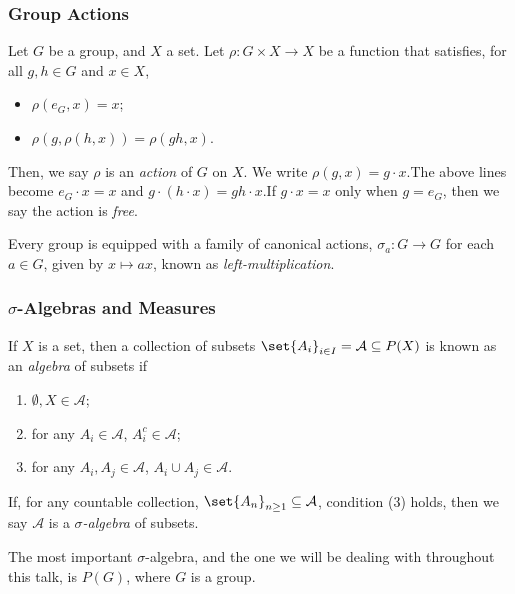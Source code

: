 \documentclass{beamer-custom}
\begin{document}
\begin{frame}
  \frametitle{Group Actions}
  Let $G$ be a group, and $X$ a set. Let $\rho\colon G\times X \rightarrow X$ be a function that satisfies, for all $g,h\in G$ and $x\in X$,\pause
  \begin{itemize}
    \item $\rho\left( e_G, x\right) = x$;\pause
    \item $\rho\left( g,\rho\left( h,x \right) \right) = \rho\left( gh,x \right)$.\pause
  \end{itemize}
  Then, we say $\rho$ is an \textit{action} of $G$ on $X$. We write $\rho\left( g,x \right) = g\cdot x$.\pause\:The above lines become $e_G\cdot x = x$ and $g\cdot \left( h\cdot x \right) = gh\cdot x$.\pause\:If $g\cdot x =x$ only when $g = e_G$, then we say the action is \textit{free}.\newline

  Every group is equipped with a family of canonical actions, $\sigma_{a}\colon G\rightarrow G$ for each $a\in G$, given by $x\mapsto ax$, known as \textit{left-multiplication}.
\end{frame}
\begin{frame}
  \frametitle{$\sigma$-Algebras and Measures}
  If $X$ is a set, then a collection of subsets $\set{A_{i}}_{i\in I} = \mathcal{A}\subseteq P(X)$ is known as an \textit{algebra} of subsets if
  \begin{enumerate}
    \item $\emptyset,X\in \mathcal{A}$;
    \item for any $A_i\in \mathcal{A}$, $A_i^{c}\in \mathcal{A}$;
    \item for any $A_i,A_j\in \mathcal{A}$, $A_i\cup A_j\in \mathcal{A}$.
  \end{enumerate}\pause
  If, for any countable collection, $\set{A_n}_{n\geq 1}\subseteq \mathcal{A}$, condition (3) holds, then we say $\mathcal{A}$ is a \textit{$\sigma$-algebra} of subsets.\pause\newline

  The most important $\sigma$-algebra, and the one we will be dealing with throughout this talk, is $P(G)$, where $G$ is a group.
\end{frame}
\end{document}
